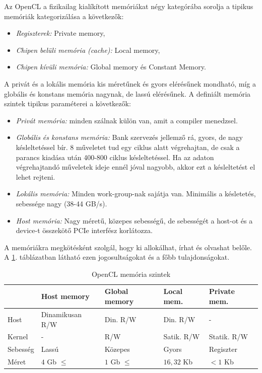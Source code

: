 	
	Az OpenCL a fizikailag kialíkított memóriákat négy kategórába sorolja a tipikus memóriák kategorizálása a következők:
	\begin{itemize}
		\item \emph{Regiszterek:} Private memory,
		\item \emph{Chipen belüli memória (cache):} Local memory,
		\item \emph{Chipen kívüli memória:} Global memory és Constant Memory.
	\end{itemize}
	A privát és a lokális memória kis méretűnek és gyors elérésűnek mondható, míg a globális és konstans memória nagynak, de
	lassú elérésűnek.
	A definiált memória szintek tipikus paraméterei a következők:
	\begin{itemize}
	 	\item \emph{Privát memória:} minden szálnak külön van, amit a compiler menedzsel.
		\item \emph{Globális és konstans memória:}  Bank szervezés jellemző rá, gyors, de nagy késleltetéssel bír. 8 műveletet
		tud egy ciklus alatt végrehajtan, de csak a parancs kiadása után 400-800 ciklus késleltetéssel. Ha az adaton végrehajtandó
		műveletek ideje ennél jóval nagyobb, akkor ezt a késleltetést el lehet rejteni. 
		\item \emph{Lokális memória:} Minden work-group-nak sajátja van. Minimális a késletetés, sebessége nagy (38-44 GB/s).
		\item \emph{Host memória:} Nagy méretű, közepes sebességű, de sebességét a host-ot és a device-t összekötő PCIe interfész
		korlátozza.
	\end{itemize}
	A memóriákra megkötésként szolgál, hogy ki allokálhat, írhat és olvashat belőle. A \ref{table:mem}. táblázatban látható ezen
	jogosultságokat és a főbb tulajdonságokat.
	
	\begin{table}[!h]
	\renewcommand{\arraystretch}{1.3}
	\caption{OpenCL memória szintek}
	\label{table:mem}
	\centering
	\begin{tabular}{l|l|l|l|l}
			 & Host memory & Global memory & Local mem. & Private mem.\\ \hline
		Host & Dinamikusan R/W & Din. R/W &  Din. R/W & - \\
		Kernel & - & R/W & Satik. R/W & Statik. R/W\\
		Sebesség & Lassú & Közepes & Gyors & Regiszter\\
		Méret & $4$ Gb $\leq$ & $1$ Gb $\leq$ & $16,32$ Kb & $<1$ Kb
	\end{tabular}
	\end{table}

